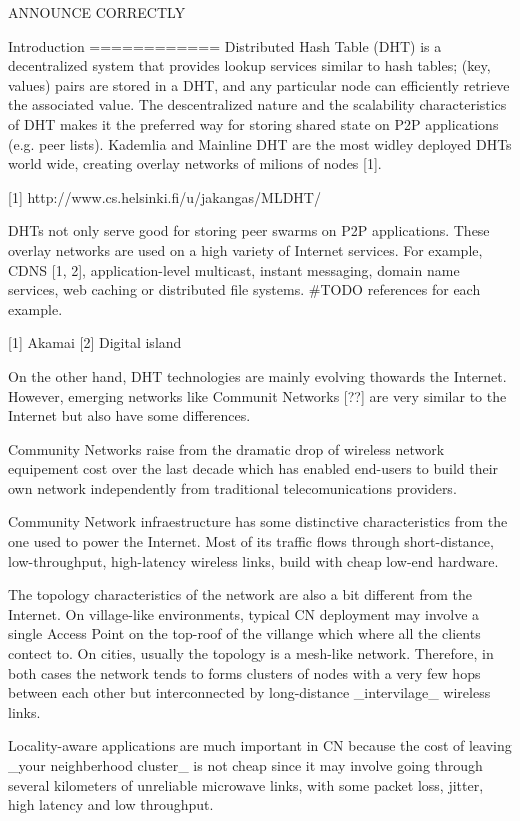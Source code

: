 ANNOUNCE CORRECTLY

Introduction
============
Distributed Hash Table (DHT) is a decentralized system that provides lookup services similar to hash tables; (key, values) pairs are stored in a DHT, and any particular node can efficiently retrieve the associated value. The descentralized nature and the scalability characteristics of DHT makes it the preferred way for storing shared state on P2P applications (e.g. peer lists). Kademlia and Mainline DHT are the most widley deployed DHTs world wide, creating overlay networks of milions of nodes [1].

[1] http://www.cs.helsinki.fi/u/jakangas/MLDHT/

DHTs not only serve good for storing peer swarms on P2P applications. These overlay networks are used on a high variety of Internet services. For example, CDNS [1, 2], application-level multicast, instant messaging, domain name services, web caching or distributed file systems. #TODO references for each example.

[1] Akamai
[2] Digital island

On the other hand, DHT technologies are mainly evolving thowards the Internet. However, emerging networks like Communit Networks [??] are very similar to the Internet but also have some differences.

Community Networks raise from the dramatic drop of wireless network equipement cost over the last decade which has enabled end-users to build their own network independently from traditional telecomunications providers.

Community Network infraestructure has some distinctive characteristics from the one used to power the Internet. Most of its traffic flows through short-distance, low-throughput, high-latency wireless links, build with cheap low-end hardware.

The topology characteristics of the network are also a bit different from the Internet. On village-like environments, typical CN deployment may involve a single Access Point on the top-roof of the villange which where all the clients contect to. On cities, usually the topology is a mesh-like network. Therefore, in both cases the network tends to forms clusters of nodes with a very few hops between each other but interconnected by long-distance _intervilage_ wireless links.

Locality-aware applications are much important in CN because the cost of leaving _your neighberhood cluster_ is not cheap since it may involve going through several kilometers of unreliable microwave links, with some packet loss, jitter, high latency and low throughput.

